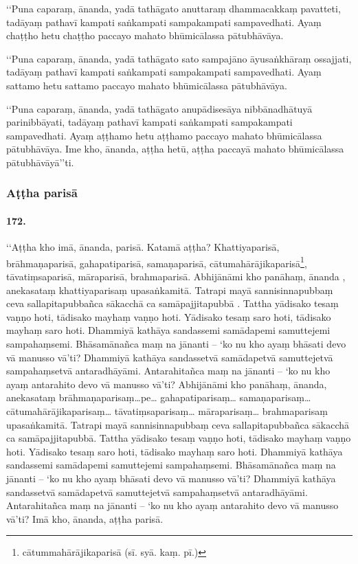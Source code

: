 ‘‘Puna caparaṃ, ānanda, yadā tathāgato anuttaraṃ dhammacakkaṃ pavatteti, tadāyaṃ pathavī kampati saṅkampati sampakampati sampavedhati. Ayaṃ chaṭṭho hetu chaṭṭho paccayo mahato bhūmicālassa pātubhāvāya.

‘‘Puna caparaṃ, ānanda, yadā tathāgato sato sampajāno āyusaṅkhāraṃ ossajjati, tadāyaṃ pathavī kampati saṅkampati sampakampati sampavedhati. Ayaṃ sattamo hetu sattamo paccayo mahato bhūmicālassa pātubhāvāya.

‘‘Puna caparaṃ, ānanda, yadā tathāgato anupādisesāya nibbānadhātuyā parinibbāyati, tadāyaṃ pathavī kampati saṅkampati sampakampati sampavedhati. Ayaṃ aṭṭhamo hetu aṭṭhamo paccayo mahato bhūmicālassa pātubhāvāya. Ime kho, ānanda, aṭṭha hetū, aṭṭha paccayā mahato bhūmicālassa pātubhāvāyā’’ti.

\subsubsection{Aṭṭha parisā}

\paragraph{172.} ‘‘Aṭṭha kho imā, ānanda, parisā. Katamā aṭṭha? Khattiyaparisā, brāhmaṇaparisā, gahapatiparisā, samaṇaparisā, cātumahārājikaparisā\footnote{cātummahārājikaparisā (sī. syā. kaṃ. pī.)}, tāvatiṃsaparisā, māraparisā, brahmaparisā. Abhijānāmi kho panāhaṃ, ānanda , anekasataṃ khattiyaparisaṃ upasaṅkamitā. Tatrapi mayā sannisinnapubbaṃ ceva sallapitapubbañca sākacchā ca samāpajjitapubbā . Tattha yādisako tesaṃ vaṇṇo hoti, tādisako mayhaṃ vaṇṇo hoti. Yādisako tesaṃ saro hoti, tādisako mayhaṃ saro hoti. Dhammiyā kathāya sandassemi samādapemi samuttejemi sampahaṃsemi. Bhāsamānañca maṃ na jānanti – ‘ko nu kho ayaṃ bhāsati devo vā manusso vā’ti? Dhammiyā kathāya sandassetvā samādapetvā samuttejetvā sampahaṃsetvā antaradhāyāmi. Antarahitañca maṃ na jānanti – ‘ko nu kho ayaṃ antarahito devo vā manusso vā’ti? Abhijānāmi kho panāhaṃ, ānanda, anekasataṃ brāhmaṇaparisaṃ…pe… gahapatiparisaṃ… samaṇaparisaṃ… cātumahārājikaparisaṃ… tāvatiṃsaparisaṃ… māraparisaṃ… brahmaparisaṃ upasaṅkamitā. Tatrapi mayā sannisinnapubbaṃ ceva sallapitapubbañca sākacchā ca samāpajjitapubbā. Tattha yādisako tesaṃ vaṇṇo hoti, tādisako mayhaṃ vaṇṇo hoti. Yādisako tesaṃ saro hoti, tādisako mayhaṃ saro hoti. Dhammiyā kathāya sandassemi samādapemi samuttejemi sampahaṃsemi. Bhāsamānañca maṃ na jānanti – ‘ko nu kho ayaṃ bhāsati devo vā manusso vā’ti? Dhammiyā kathāya sandassetvā samādapetvā samuttejetvā sampahaṃsetvā antaradhāyāmi. Antarahitañca maṃ na jānanti – ‘ko nu kho ayaṃ antarahito devo vā manusso vā’ti? Imā kho, ānanda, aṭṭha parisā.

